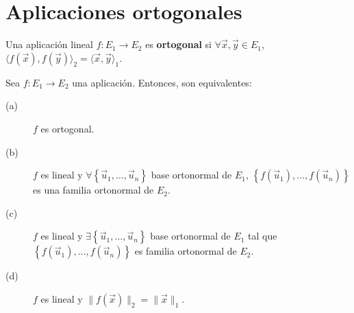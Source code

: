 \section{Aplicaciones ortogonales}
\begin{fdefinition}
\normalfont Una aplicación lineal $\displaystyle f : E_{1} \to E_{2}$ es \textbf{ortogonal} si $\displaystyle \forall \vec{x}, \vec{y} \in E_{1} $, $\displaystyle \langle f\left(\vec{x}\right), f\left(\vec{y}\right)\rangle_{2} = \langle \vec{x}, \vec{y}\rangle_{1} $.
\end{fdefinition}
\begin{ftheorem}[]
\normalfont Sea $\displaystyle f : E_{1} \to E_{2}$ una aplicación. Entonces, son equivalentes:
\begin{description}
\item[(a)] $\displaystyle f $ es ortogonal.
\item[(b)] $\displaystyle f $ es lineal y $\displaystyle \forall \left\{ \vec{u}_{1}, \ldots, \vec{u}_{n}\right\}  $ base ortonormal de $\displaystyle E_{1} $, $\displaystyle \left\{ f\left(\vec{u}_{1}\right), \ldots, f\left(\vec{u}_{n}\right)\right\}  $ es una familia ortonormal de $\displaystyle E_{2} $.
\item[(c)] $\displaystyle f $ es lineal y $\displaystyle \exists \left\{ \vec{u}_{1}, \ldots, \vec{u}_{n}\right\}  $ base ortonormal de $\displaystyle E_{1} $ tal que $\displaystyle \left\{ f\left(\vec{u}_{1}\right), \ldots, f\left(\vec{u}_{n}\right)\right\}  $ es familia ortonormal de $\displaystyle E_{2} $.
\item[(d)] $\displaystyle f $ es lineal y $\displaystyle \| f\left(\vec{x}\right)\|_{2} = \|\vec{x}\|_{1} $.
\end{description}
\end{ftheorem}
